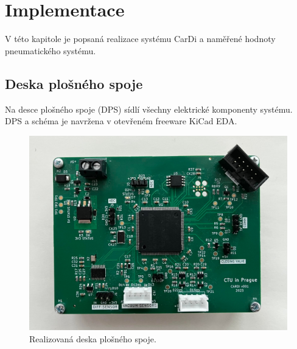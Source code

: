 \chapter{Implementace}
V této kapitole je popsaná realizace systému CarDi a naměřené hodnoty pneumatického systému.

\section{Deska plošného spoje}
Na desce plošného spoje (DPS) sídlí všechny elektrické komponenty systému. DPS a schéma je navržena v otevřeném freeware KiCad EDA.
\begin{figure}[H]
    \includegraphics[width=1\linewidth]{pictures/pcb_full.jpg}
    \caption{Realizovaná deska plošného spoje.}
    \label{fig:pcb_full}
\end{figure}

